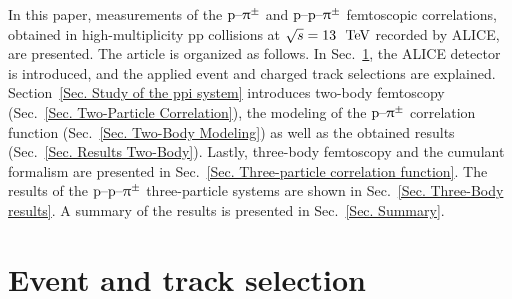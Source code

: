 \documentclass[ALICE,manyauthors]{cernphprep}
\begin{document}
In this paper, measurements of the $\text{p--}\uppi^\pm$ and $\text{p--p--}\uppi^\pm$ femtoscopic correlations, obtained in high-multiplicity pp collisions at $\sqrt{s} =13~\text{ TeV}$ recorded by ALICE, are presented.  The article is organized as follows. In Sec.~\ref{s:DataAnalysis}, the ALICE detector is introduced, and the applied event and charged track selections are explained. Section~\ref{Sec. Study of the ppi system} introduces two-body femtoscopy (Sec.~\ref{Sec. Two-Particle Correlation}), the modeling of the $\text{p--}\uppi^\pm$ correlation function (Sec.~\ref{Sec. Two-Body Modeling}) as well as the obtained results (Sec.~\ref{Sec. Results Two-Body}). Lastly, three-body femtoscopy and the cumulant formalism are presented in Sec.~\ref{Sec. Three-particle correlation function}. The results of the $\text{p--p--}\uppi^\pm$ three-particle systems are shown in Sec.~\ref{Sec. Three-Body results}. A summary of the results is presented in Sec.~\ref{Sec. Summary}.

\section{Event and track selection}
\label{s:DataAnalysis}
\end{document}
